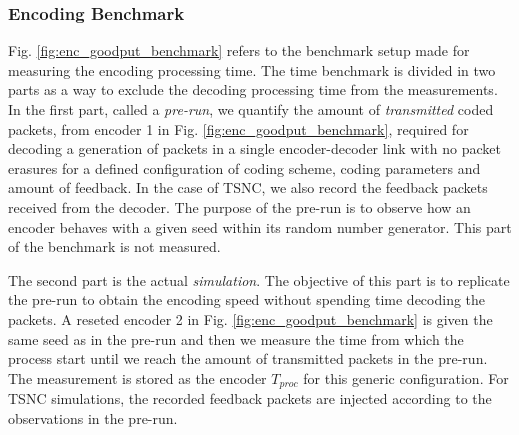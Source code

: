 \subsubsection{Encoding Benchmark}
Fig. \ref{fig:enc_goodput_benchmark} refers to the benchmark setup
made for measuring the encoding processing time.
The time benchmark
is divided in two parts as a way to exclude the decoding processing
time from the measurements. In the first part, called a \textit{pre-run},
we quantify the amount of \textit{transmitted} coded packets, from
encoder 1 in Fig. \ref{fig:enc_goodput_benchmark}, required for
decoding a generation of packets in a single encoder-decoder link
with no packet erasures
for a defined configuration of coding scheme, coding parameters and
amount of feedback. In the case of \ac{TSNC}, we also record the
feedback packets received from the decoder. The purpose of
the pre-run is to observe how an encoder behaves with a given
seed within its random number generator.
This part of the benchmark is not measured.

The second part is the actual \textit{simulation}. The objective of this
part is to replicate the pre-run to obtain the encoding speed without
spending time decoding the packets.
A reseted encoder 2 in Fig. \ref{fig:enc_goodput_benchmark} is given the
same seed as in the pre-run and then we measure the time from which the 
process start until we reach the amount of transmitted packets in the
pre-run. The measurement is stored as the encoder $T_{proc}$ for
this generic configuration. For \ac{TSNC} simulations, the recorded
feedback packets are injected according to the observations in the pre-run.

